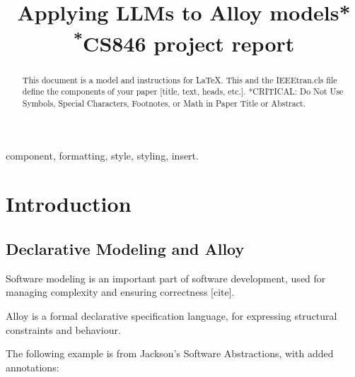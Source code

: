 \documentclass[conference]{IEEEtran}
\begin{document}
\title{Applying LLMs to Alloy models*\\
{\footnotesize \textsuperscript{*}CS846 project report}
}

\author{


}

\maketitle

\begin{abstract}
This document is a model and instructions for \LaTeX.
This and the IEEEtran.cls file define the components of your paper [title, text, heads, etc.]. *CRITICAL: Do Not Use Symbols, Special Characters, Footnotes, 
or Math in Paper Title or Abstract.
\end{abstract}


\begin{IEEEkeywords}
component, formatting, style, styling, insert.
\end{IEEEkeywords}


\section{Introduction}


\subsection{Declarative Modeling and Alloy}

Software modeling is an important part of software development, used for managing complexity and ensuring correctness [cite].


Alloy is a formal declarative specification language, for expressing structural constraints and behaviour.


The following example is from Jackson's Software Abstractions, with added annotations:
\end{document}
